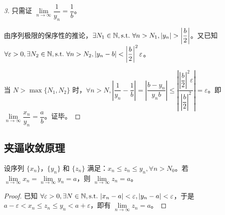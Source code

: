 \begin{proof}[3]
	只需证 $\lim\limits_{n \rightarrow \infty} \dfrac{1}{y_n} = \dfrac{1}{b}$。

	由序列极限的保序性的推论，$\exists N_1 \in \mathbb N, \text{s.t.~} \forall n > N_1, |y_n| > \left| \dfrac{b}{2} \right|$。又已知 $\forall \varepsilon > 0, \exists N_2 \in \mathbb N, \text{s.t.~} \forall n > N_2, |y_n - b| < \left| \dfrac{b}{2} \right|^2 \varepsilon$。

	当 $N > \max\{N_1, N_2\}$ 时，$\forall n > N, \left| \dfrac{1}{y_n} - \dfrac{1}{b} \right| = \left| \dfrac{b - y_n}{y_n b} \right| \le \left| \dfrac{\left| \dfrac{b}{2} \right|^2 \varepsilon}{\left| \dfrac{b}{2} \right|^2} \right| = \varepsilon$。即 $\lim\limits_{n \rightarrow \infty} \dfrac{x_n}{y_n} = \dfrac{a}{b}$。证毕。
\end{proof}

\subsection{夹逼收敛原理}

\begin{theorem}[夹逼收敛原理]
	设序列 $\{x_n\}$，$\{y_n\}$ 和 $\{z_n\}$ 满足：$x_n \le z_n \le y_n, \forall n > N_0$。若 $\lim\limits_{n \rightarrow \infty} x_n = \lim\limits_{n \rightarrow \infty} y_n = a$，则 $\lim\limits_{n \rightarrow \infty} z_n = a$。
\end{theorem}

\begin{proof}
	已知 $\forall \varepsilon > 0, \exists N \in \mathbb N, \text{s.t.~} |x_n - a| < \varepsilon, |y_n - a| < \varepsilon$，于是 $a - \varepsilon < x_n \le z_n \le y_n < a + \varepsilon$，即有 $\lim\limits_{n \rightarrow \infty} z_n = a$。
\end{proof}